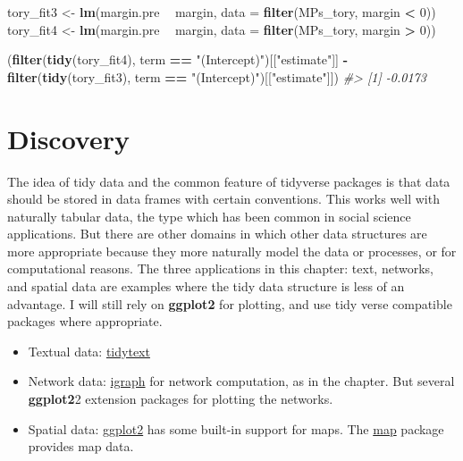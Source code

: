 \documentclass[]{book}
\newenvironment{Shaded}{\begin{snugshade}}{\end{snugshade}}
\newcommand{\CommentTok}[1]{\textcolor[rgb]{0.56,0.35,0.01}{\textit{#1}}}
\newcommand{\DataTypeTok}[1]{\textcolor[rgb]{0.13,0.29,0.53}{#1}}
\newcommand{\DecValTok}[1]{\textcolor[rgb]{0.00,0.00,0.81}{#1}}
\newcommand{\KeywordTok}[1]{\textcolor[rgb]{0.13,0.29,0.53}{\textbf{#1}}}
\newcommand{\NormalTok}[1]{#1}
\newcommand{\OperatorTok}[1]{\textcolor[rgb]{0.81,0.36,0.00}{\textbf{#1}}}
\newcommand{\StringTok}[1]{\textcolor[rgb]{0.31,0.60,0.02}{#1}}
\providecommand{\tightlist}{%
  \setlength{\itemsep}{0pt}\setlength{\parskip}{0pt}}
\theoremstyle{definition}
\theoremstyle{definition}
\theoremstyle{definition}
\theoremstyle{remark}
\begin{document}
\begin{Shaded}
\begin{Highlighting}[]
\NormalTok{tory_fit3 <-}\StringTok{ }\KeywordTok{lm}\NormalTok{(margin.pre }\OperatorTok{~}\StringTok{ }\NormalTok{margin, }\DataTypeTok{data =} \KeywordTok{filter}\NormalTok{(MPs_tory, margin }\OperatorTok{<}\StringTok{ }\DecValTok{0}\NormalTok{))}
\NormalTok{tory_fit4 <-}\StringTok{ }\KeywordTok{lm}\NormalTok{(margin.pre }\OperatorTok{~}\StringTok{ }\NormalTok{margin, }\DataTypeTok{data =} \KeywordTok{filter}\NormalTok{(MPs_tory, margin }\OperatorTok{>}\StringTok{ }\DecValTok{0}\NormalTok{))}

\NormalTok{(}\KeywordTok{filter}\NormalTok{(}\KeywordTok{tidy}\NormalTok{(tory_fit4), term }\OperatorTok{==}\StringTok{ "(Intercept)"}\NormalTok{)[[}\StringTok{"estimate"}\NormalTok{]] }\OperatorTok{-}
\StringTok{ }\KeywordTok{filter}\NormalTok{(}\KeywordTok{tidy}\NormalTok{(tory_fit3), term }\OperatorTok{==}\StringTok{ "(Intercept)"}\NormalTok{)[[}\StringTok{"estimate"}\NormalTok{]])}
\CommentTok{#> [1] -0.0173}
\end{Highlighting}
\end{Shaded}

\hypertarget{discovery}{%
\chapter{Discovery}\label{discovery}}

The idea of tidy data and the common feature of tidyverse packages is
that data should be stored in data frames with certain conventions. This
works well with naturally tabular data, the type which has been common
in social science applications. But there are other domains in which
other data structures are more appropriate because they more naturally
model the data or processes, or for computational reasons. The three
applications in this chapter: text, networks, and spatial data are
examples where the tidy data structure is less of an advantage. I will
still rely on \textbf{ggplot2} for plotting, and use tidy verse
compatible packages where appropriate.

\begin{itemize}
\tightlist
\item
  Textual data:
  \href{https://cran.r-project.org/package=tidytext}{tidytext}
\item
  Network data: \href{https://cran.r-project.org/package=igraph}{igraph}
  for network computation, as in the chapter. But several
  \textbf{ggplot2}2 extension packages for plotting the networks.
\item
  Spatial data:
  \href{https://cran.r-project.org/package=ggplot2}{ggplot2} has some
  built-in support for maps. The
  \href{https://cran.r-project.org/package=map}{map} package provides
  map data.
\end{itemize}
\end{document}
